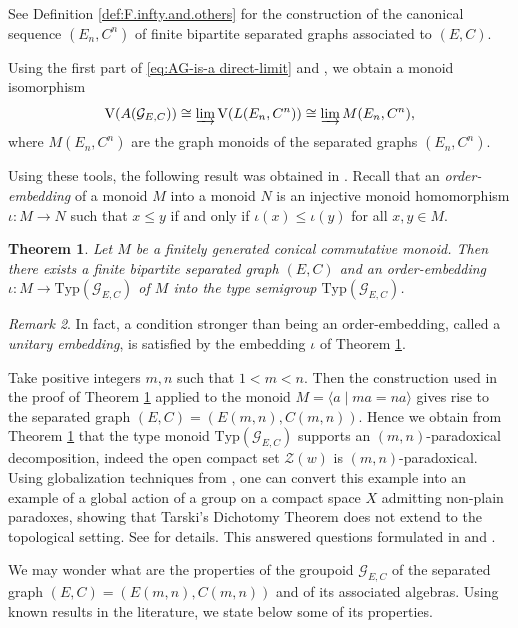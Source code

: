 \documentclass[11pt]{amsart}
\theoremstyle{plain}            %
\newtheorem{theorem}{Theorem}[section]
\theoremstyle{definition}       %
\theoremstyle{definition}       %
\theoremstyle{remark}
\newtheorem{remark}[theorem]{Remark}
\newcommand{\V}{\mathrm{V}}
\newcommand{\Typ}{\mathrm{Typ}}
\begin{document}
See Definition \ref{def:F.infty.and.others} for the construction of the canonical sequence $(E_n,C^n)$ of finite bipartite separated graphs
associated to $(E,C)$. 

Using the first part of \eqref{eq:AG-is-a direct-limit} and \cite[Theorem 4.3]{ag12}, we obtain a monoid isomorphism 
$$\V(A(\mathcal G_{E,C})) \cong \varinjlim \V (L(E_n,C^n))   \cong \varinjlim M(E_n,C^n),$$ 
where $M(E_n,C^n)$ are the graph monoids of the separated graphs $(E_n,C^n)$.   


Using these tools, the following result was obtained in \cite{ae14}. Recall that an {\it order-embedding}
of a monoid $M$ into a monoid $N$ is an injective monoid homomorphism $\iota\colon M\to N$ such that $x\le y$ if and only if $\iota (x)\le \iota (y)$ for all $x,y\in M$. 

\begin{theorem} {\rm{\cite[Theorem 7.5]{ae14}}} 
	\label{thm:main-typesemigroup} Let $M$ be a finitely generated
 conical commutative monoid. Then there exists a finite bipartite separated graph $(E,C)$
	and an order-embedding $\iota\colon M\to \Typ (\mathcal G_{E,C})$ of $M$ into the type semigroup $\Typ (\mathcal G_{E,C})$. 
\end{theorem}

\begin{remark}
\label{rem:unitary-embedding} In fact, a condition stronger than being an order-embedding, called a {\it unitary embedding}, is satisfied by the embedding $\iota 
$ of Theorem \ref{thm:main-typesemigroup}. 
\end{remark}

Take positive integers $m,n$ such that $1<m<n$. Then the construction used in the proof of 
Theorem \ref{thm:main-typesemigroup} applied to
the monoid $M=\langle a \mid ma=na\rangle$ gives rise to the  
separated graph $(E,C)=(E(m,n), C(m,n))$. Hence we obtain from Theorem \ref{thm:main-typesemigroup} that the type monoid $\Typ  (\mathcal G_{E,C} )$ supports an $(m,n)$-paradoxical decomposition, indeed the open compact set $\mathcal Z (w)$ is $(m,n)$-paradoxical.  Using globalization techniques from \cite{Abadie}, one can convert this example into an example of a global action of a group on a compact space $X$ admitting non-plain paradoxes, showing that Tarski's Dichotomy Theorem does not extend to the topological setting. See \cite[Section 7]{ae14} for details. This answered questions formulated in  \cite{KN} and \cite{RorSie}. 

We may wonder what are the properties of the groupoid $\mathcal G_{E,C}$ of the separated graph $(E,C) = (E(m,n),C(m,n))$ and of its associated algebras. Using known results in the literature, we 
state below some of its properties.
 
\end{document}
